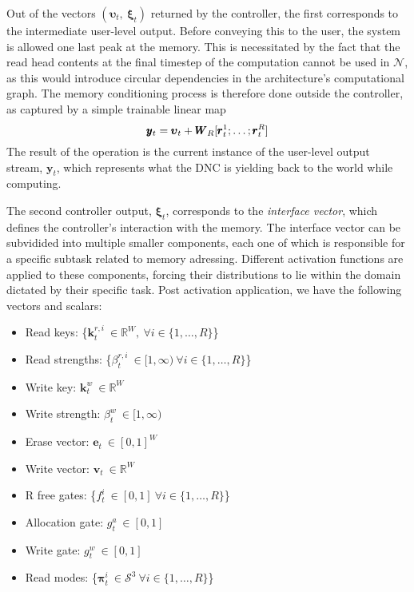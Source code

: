 \documentclass[]{article}
\begin{document}
Out of the vectors $(\pmb{\upsilon}_t,\ \pmb{\xi}_t)$ returned by the controller, the first corresponds to the intermediate user-level output. Before conveying this to the user, the system is allowed one last peak at the memory. This is necessitated by the fact that the read head contents at the final timestep of the computation cannot be used in $\mathcal{N}$, as this would introduce circular dependencies in the architecture's computational graph. The memory conditioning process is therefore done outside the controller, as captured by a simple trainable linear map \begin{equation}
\notag
\pmb{y}_t = \pmb{\upsilon}_t + \pmb{W}_R[\pmb{r}_{t}^1;\dots;\pmb{r}_{t}^R]
\label{eqn:Memory Conditioning}
\end{equation}
The result of the operation is the current instance of the user-level output stream, $\pmb{y}_t$, which represents what the DNC is yielding back to the world while computing. 

The second controller output, $\pmb{\xi}_t$, corresponds to the \textit{interface vector}, which defines the controller's interaction with the memory. The interface vector can be subvidided into multiple smaller components, each one of which is responsible for a specific subtask related to memory adressing. Different activation functions are applied to these components, forcing their distributions to lie within the domain dictated by their specific task. Post activation application, we have the following vectors and scalars:

\vspace{10pt}
\hspace{-40pt}
\begin{minipage}{0.6\textwidth}
\begin{itemize}
\item Read keys: \{$\pmb{k}_t^{r,i} \ \in \mathbb{R}^W, \ \forall i \in \{1,\dots,R\}$\}
\item Read strengths: \{$\beta_t^{r,i} \ \in [1, \infty) \ \forall i \in \{1,\dots,R\}$\}
\item Write key: $\pmb{k}_t^w \ \in \mathbb{R}^W$
\item Write strength: $\beta_t^w \ \in [1, \infty)$
\item Erase vector: $\pmb{e}_t \ \in [0,1]^W$
\end{itemize}
\end{minipage}
\hspace{-20pt}
\begin{minipage}{0.5\textwidth}
\begin{itemize}
\item Write vector: $\pmb{v}_t \ \in \mathbb{R}^W$
\item R free gates: \{$f_t^i \ \in [0,1] \ \forall i \in \{1,\dots,R\}$\}
\item Allocation gate: $g_t^a \ \in [0,1]$
\item Write gate: $g_t^w \ \in [0,1]$
\item Read modes: \{$\pmb{\pi}_t^i \ \in \mathcal{S}^3 \ \forall i \in \{1,\dots,R\}$\}
\end{itemize}
\end{minipage}
\vspace{10pt}
\end{document}
